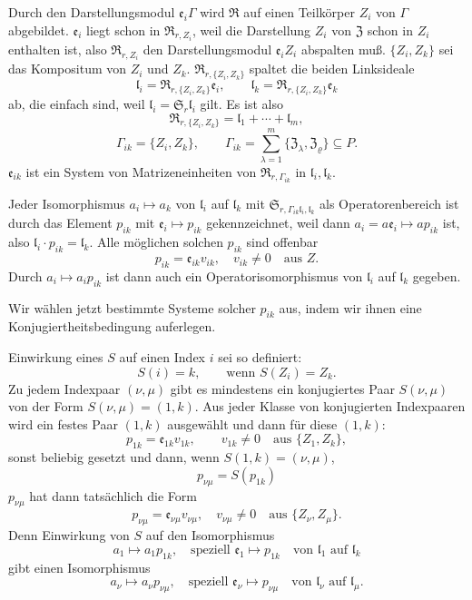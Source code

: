 \documentclass[12pt,a4paper]{article}
\theoremstyle{plain}
\theoremstyle{definition}
\theoremstyle{remark}
\begin{document}
Durch den Darstellungsmodul $\mathfrak{e}_{i}\varGamma$ wird $\mathfrak{R}$ auf einen Teilk\"orper $Z_{i}$ von
$\varGamma$ abgebildet. $\mathfrak{e}_{i}$ liegt schon in $\mathfrak{R}_{r,Z_{i}}$, weil die Darstellung $Z_{i}$ von
$\mathfrak{Z}$ schon in $Z_{i}$ enthalten ist, also $\mathfrak{R}_{r,Z_{i}}$ den Darstellungsmodul
$\mathfrak{e}_{i}Z_{i}$ abspalten mu\ss. $\{Z_{i}, Z_{k}\}$ sei das Kompositum von $Z_{i}$ und $Z_{k}$.
$\mathfrak{R}_{r,\{Z_{i},Z_{k}\}}$ spaltet die beiden Linksideale
\[
\mathfrak{l}_{i} = \mathfrak{R}_{r,\{Z_{i},Z_{k}\}}\mathfrak{e}_{i}, \qquad
\mathfrak{l}_{k} = \mathfrak{R}_{r,\{Z_{i},Z_{k}\}}\mathfrak{e}_{k}
\]
ab, die einfach sind, weil $\mathfrak{l}_{i} = \mathfrak{S}_{r}\mathfrak{l}_{i}$ gilt. Es ist also
\[
\mathfrak{R}_{r,\{Z_{i},Z_{k}\}} = \mathfrak{l}_{1} + \cdots + \mathfrak{l}_{m},
\]
\[
\varGamma_{ik} = \{Z_{i}, Z_{k}\}, \qquad \varGamma_{ik} = \sum_{\lambda=1}^{m}\{\mathfrak{Z}_{\lambda}, \mathfrak{Z}_{\varrho}\} \subseteq P.
\]
$\mathfrak{e}_{ik}$ ist ein System von Matrizeneinheiten von $\mathfrak{R}_{r,\varGamma_{ik}}$ in $\mathfrak{l}_{i}, \mathfrak{l}_{k}$.

Jeder Isomorphismus $a_{i} \mapsto a_{k}$ von $\mathfrak{l}_{i}$ auf $\mathfrak{l}_{k}$ mit $\mathfrak{S}_{r,\Gamma_{ik}\mathfrak{l}_{i},\mathfrak{l}_{k}}$
als Operatorenbereich ist durch das Element $p_{ik}$ mit $\mathfrak{e}_{i} \mapsto p_{ik}$
gekennzeichnet, weil dann $a_{i} = a\mathfrak{e}_{i} \mapsto ap_{ik}$ ist, also
$\mathfrak{l}_{i} \cdot p_{ik} = \mathfrak{l}_{k}$. Alle m\"oglichen solchen $p_{ik}$ sind offenbar
\[
p_{ik} = \mathfrak{e}_{ik}v_{ik}, \quad v_{ik} \neq 0 \quad \text{aus } Z.
\]
Durch $a_{i} \mapsto a_{i}p_{ik}$ ist dann auch ein Operatorisomorphismus von $\mathfrak{l}_{i}$
auf $\mathfrak{l}_{k}$ gegeben.

Wir w\"ahlen jetzt bestimmte Systeme solcher $p_{ik}$ aus, indem wir ihnen eine
Konjugiertheitsbedingung auferlegen.

Einwirkung eines $S$ auf einen Index $i$ sei so definiert:
\[
S(i) = k, \qquad \text{wenn } S(Z_{i}) = Z_{k}.
\]
Zu jedem Indexpaar $(\nu, \mu)$ gibt es mindestens ein konjugiertes Paar
$S(\nu, \mu)$ von der Form $S(\nu, \mu) = (1, k)$. Aus jeder Klasse von konjugierten
Indexpaaren wird ein festes Paar $(1, k)$ ausgew\"ahlt und dann f\"ur diese
$(1, k)$:
\[
p_{1k} = \mathfrak{e}_{1k}v_{1k}, \qquad v_{1k} \neq 0 \quad \text{aus } \{Z_{1}, Z_{k}\},
\]
sonst beliebig gesetzt und dann, wenn $S(1, k) = (\nu, \mu)$,
\[
p_{\nu\mu} = S(p_{1k})
\]
$p_{\nu\mu}$ hat dann tats\"achlich die Form
\[
p_{\nu\mu} = \mathfrak{e}_{\nu\mu}v_{\nu\mu}, \quad v_{\nu\mu} \neq 0 \quad \text{aus } \{Z_{\nu}, Z_{\mu}\}.
\]
Denn Einwirkung von $S$ auf den Isomorphismus
\[
a_{1} \mapsto a_{1}p_{1k}, \quad \text{speziell } \mathfrak{e}_{1} \mapsto p_{1k} \quad \text{von } \mathfrak{l}_{1} \text{ auf } \mathfrak{l}_{k}
\]
gibt einen Isomorphismus
\[
a_{\nu} \mapsto a_{\nu}p_{\nu\mu}, \quad \text{speziell } \mathfrak{e}_{\nu} \mapsto p_{\nu\mu} \quad \text{von } \mathfrak{l}_{\nu} \text{ auf } \mathfrak{l}_{\mu}.
\]
\end{document}
